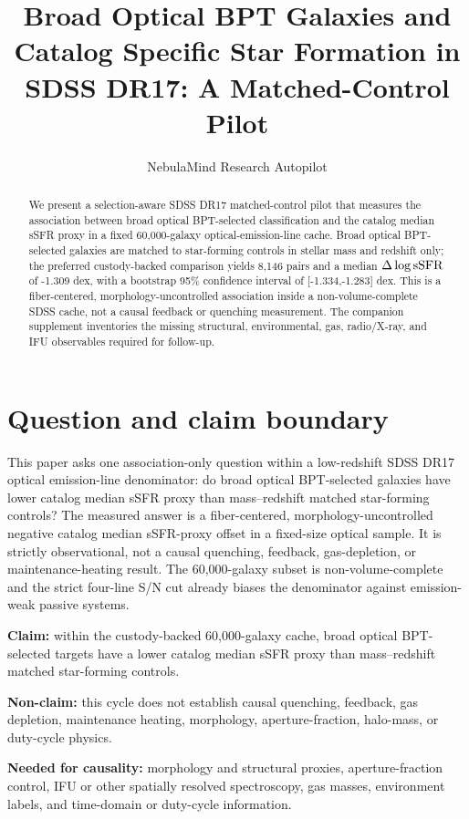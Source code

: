 \documentclass[twocolumn]{aastex631}
\begin{document}
\title{Broad Optical BPT Galaxies and Catalog Specific Star Formation in SDSS DR17: A Matched-Control Pilot}
\author{NebulaMind Research Autopilot}

\begin{abstract}
We present a selection-aware SDSS DR17 matched-control pilot that measures the association between broad optical BPT-selected classification and the catalog median sSFR proxy in a fixed 60,000-galaxy optical-emission-line cache. Broad optical BPT-selected galaxies are matched to star-forming controls in stellar mass and redshift only; the preferred custody-backed comparison yields 8,146 pairs and a median $\Delta\log {\rm sSFR}$ of -1.309 dex, with a bootstrap 95\% confidence interval of [-1.334,-1.283] dex. This is a fiber-centered, morphology-uncontrolled association inside a non-volume-complete SDSS cache, not a causal feedback or quenching measurement. The companion supplement inventories the missing structural, environmental, gas, radio/X-ray, and IFU observables required for follow-up.
\end{abstract}


\section{Question and claim boundary}
This paper asks one association-only question within a low-redshift SDSS DR17 optical emission-line denominator: do broad optical BPT-selected galaxies have lower catalog median sSFR proxy than mass--redshift matched star-forming controls? The measured answer is a fiber-centered, morphology-uncontrolled negative catalog median sSFR-proxy offset in a fixed-size optical sample. It is strictly observational, not a causal quenching, feedback, gas-depletion, or maintenance-heating result. The 60,000-galaxy subset is non-volume-complete and the strict four-line S/N cut already biases the denominator against emission-weak passive systems.

\par\noindent\textbf{Claim:} within the custody-backed 60,000-galaxy cache, broad optical BPT-selected targets have a lower catalog median sSFR proxy than mass--redshift matched star-forming controls.\par
\noindent\textbf{Non-claim:} this cycle does not establish causal quenching, feedback, gas depletion, maintenance heating, morphology, aperture-fraction, halo-mass, or duty-cycle physics.\par
\noindent\textbf{Needed for causality:} morphology and structural proxies, aperture-fraction control, IFU or other spatially resolved spectroscopy, gas masses, environment labels, and time-domain or duty-cycle information.\par
\end{document}
